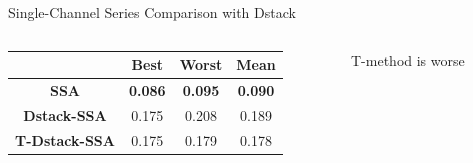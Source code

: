 \documentclass[pdf, unicode, ucs, notheorems]{beamer}
\newcommand{\bluetext}[1]{{\usebeamercolor[fg]{bluetext_color}#1}}
\theoremstyle{definition}
\begin{document}
\begin{frame}{Single-Channel Series Comparison with Dstack}
  \begin{columns}
    \begin{column}{0.7\textwidth}
      \begin{table}[ht]
        \centering
        \begin{tabular}{c|ccc}
          \hline
          & Best & Worst & Mean \\
          \hline
          \textbf{SSA} & \textbf{\bluetext{0.086}} &
          \textbf{\bluetext{0.095}} &
          \textbf{\bluetext{0.090}} \\
          \textbf{Dstack-SSA} & 0.175 & 0.208 & 0.189 \\
          \textbf{T-Dstack-SSA} & 0.175 & 0.179 & 0.178 \\
          \hline
        \end{tabular}
      \end{table}
    \end{column}
    \begin{column}{0.3\textwidth}
      T-method is worse
    \end{column}
  \end{columns}
\end{frame}


\end{document}
